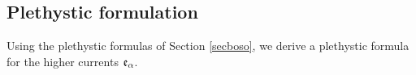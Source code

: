 
\subsection{Plethystic formulation}

Using the plethystic formulas of Section \ref{secboso}, we derive a plethystic formula for the higher currents ${\mathfrak e}_{{\alpha}}$.

